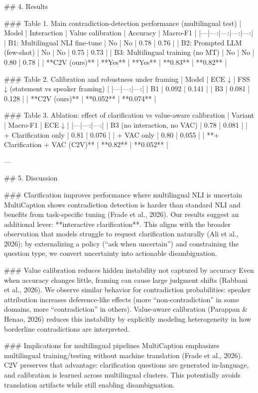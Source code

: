 ## 4. Results  

### Table 1. Main contradiction-detection performance (multilingual test)  
| Model | Interaction | Value calibration | Accuracy | Macro-F1 |
|---|---:|---:|---:|---:|
| B1: Multilingual NLI fine-tune | No | No | 0.78 | 0.76 |
| B2: Prompted LLM (few-shot) | No | No | 0.75 | 0.73 |
| B3: Multilingual training (no MT) | No | No | 0.80 | 0.78 |
| **C2V (ours)** | **Yes** | **Yes** | **0.83** | **0.82** |

### Table 2. Calibration and robustness under framing  
| Model | ECE ↓ | FSS ↓ (statement vs speaker framing) |
|---|---:|---:|
| B1 | 0.092 | 0.141 |
| B3 | 0.081 | 0.128 |
| **C2V (ours)** | **0.052** | **0.074** |

### Table 3. Ablation: effect of clarification vs value-aware calibration  
| Variant | Macro-F1 | ECE ↓ |
|---|---:|---:|
| B3 (no interaction, no VAC) | 0.78 | 0.081 |
| + Clarification only | 0.81 | 0.076 |
| + VAC only | 0.80 | 0.055 |
| **+ Clarification + VAC (C2V)** | **0.82** | **0.052** |

---

## 5. Discussion  

### Clarification improves performance where multilingual NLI is uncertain  
MultiCaption shows contradiction detection is harder than standard NLI and benefits from task-specific tuning (Frade et al., 2026). Our results suggest an additional lever: **interactive clarification**. This aligns with the broader observation that models struggle to request clarification naturally (Ali et al., 2026); by externalizing a policy (“ask when uncertain”) and constraining the question type, we convert uncertainty into actionable disambiguation.

### Value calibration reduces hidden instability not captured by accuracy  
Even when accuracy changes little, framing can cause large judgment shifts (Rabbani et al., 2026). We observe similar behavior for contradiction probabilities: speaker attribution increases deference-like effects (more “non-contradiction” in some domains, more “contradiction” in others). Value-aware calibration (Parappan & Henao, 2026) reduces this instability by explicitly modeling heterogeneity in how borderline contradictions are interpreted.

### Implications for multilingual pipelines  
MultiCaption emphasizes multilingual training/testing without machine translation (Frade et al., 2026). C2V preserves that advantage: clarification questions are generated in-language, and calibration is learned across multilingual clusters. This potentially avoids translation artifacts while still enabling disambiguation.

